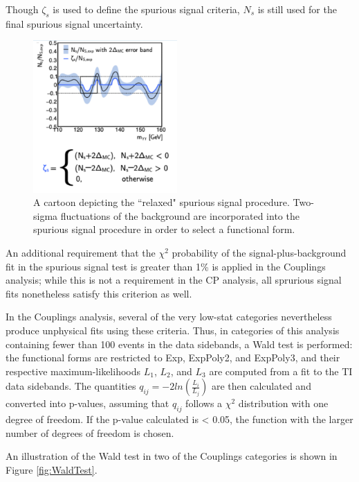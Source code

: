 Though $\zeta_{s}$ is used to define the spurious signal criteria, $N_{s}$ is still used for the final spurious signal uncertainty. 

\begin{figure}
\centering
\includegraphics[width=0.49\textwidth]{figures/sigbkgparam/SSRelaxed.png}
\caption{A cartoon depicting the ``relaxed" spurious signal procedure. Two-sigma fluctuations of the background are incorporated into the spurious signal procedure in order to select a functional form.}
\label{fig:SSrelaxed}
\end{figure} 


An additional requirement that the $\chi^{2}$ probability of the signal-plus-background fit in the spurious signal test is greater than 1\% is applied in the Couplings analysis; while this is not a requirement in the CP analysis, all sprurious signal fits nonetheless satisfy this criterion as well.

In the Couplings analysis, several of the very low-stat categories nevertheless produce unphysical fits using these criteria. Thus, in categories of this analysis containing fewer than 100 events in the data sidebands, a Wald test is performed: the functional forms are restricted to Exp, ExpPoly2, and ExpPoly3, and their respective maximum-likelihoods $L_{1}$, $L_{2}$, and $L_{3}$ are computed from a fit to the TI data sidebands. The quantities $q_{ij} = -2 ln(\frac{L_{i}}{L_{j}})$ are then calculated and converted into p-values, assuming that $q_{ij}$ follows a $\chi^{2}$ distribution with one degree of freedom. If the p-value calculated is < 0.05, the function with the larger number of degrees of freedom is chosen. 

An illustration of the Wald test in two of the Couplings categories is shown in Figure \ref{fig:WaldTest}.


